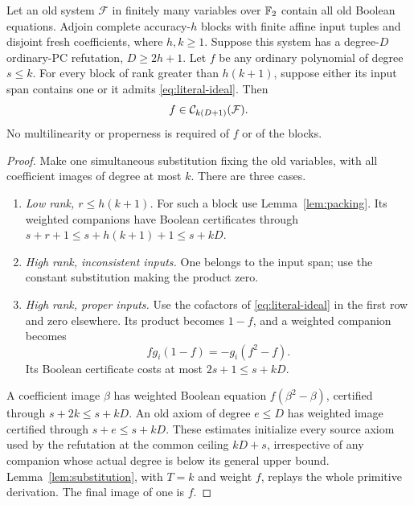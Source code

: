 \begin{lemma}\label{lem:hybrid}
Let an old system \(\mathcal F\) in finitely many variables over \(\mathbb F_2\)
contain all old Boolean equations. Adjoin complete accuracy-\(h\) blocks
with finite affine input tuples and disjoint fresh coefficients, where
\(h,k\ge1\). Suppose this system has a degree-\(D\) ordinary-PC refutation,
\(D\ge2h+1\). Let \(f\) be any ordinary polynomial of degree \(s\le k\).
For every block of rank greater than \(h(k+1)\), suppose either its input
span contains one or it admits \eqref{eq:literal-ideal}. Then
\[
 f\in\mathcal C_{k(D+1)}(\mathcal F).
\]
No multilinearity or properness is required of \(f\) or of the blocks.
\end{lemma}
\begin{proof}
Make one simultaneous substitution fixing the old variables, with all
coefficient images of degree at most \(k\). There are three cases.
\begin{enumerate}
\item \emph{Low rank, \(r\le h(k+1)\).} For such a block use
Lemma~\ref{lem:packing}. Its weighted companions have Boolean certificates
through \(s+r+1\le s+h(k+1)+1\le s+kD\).
\item \emph{High rank, inconsistent inputs.} One belongs to the input
span; use the constant substitution making the product zero.
\item \emph{High rank, proper inputs.} Use the cofactors of
\eqref{eq:literal-ideal} in the first row and zero elsewhere. Its product
becomes \(1-f\), and a weighted companion becomes
\[
 fg_i(1-f)=-g_i(f^2-f).
\]
Its Boolean certificate costs at most \(2s+1\le s+kD\).
\end{enumerate}
A coefficient image \(\beta\) has weighted Boolean equation
\(f(\beta^2-\beta)\), certified through \(s+2k\le s+kD\).
An old axiom of degree \(e\le D\) has weighted image certified through
\(s+e\le s+kD\). These estimates initialize every source axiom used
by the refutation at the common ceiling \(kD+s\), irrespective of any
companion whose actual degree is below its general upper bound.
Lemma~\ref{lem:substitution}, with \(T=k\) and weight \(f\), replays the
whole primitive derivation. The final image of one is \(f\).
\end{proof}

